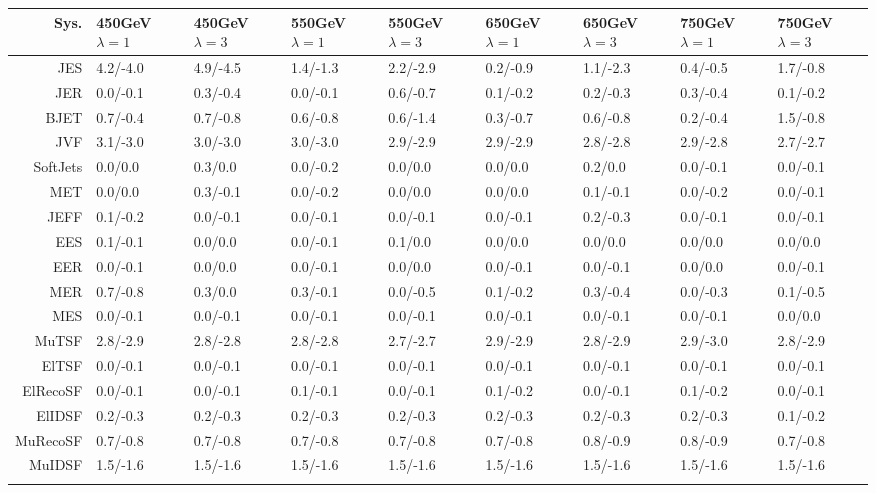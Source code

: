 \begin{tabular}{r|p{.08\linewidth}p{.08\linewidth}p{.08\linewidth}p{.08\linewidth}p{.08\linewidth}p{.08\linewidth}p{.08\linewidth}p{.08\linewidth}}
\toprule
 Sys.  & 450GeV $\lambda=1$  & 450GeV $\lambda=3$  & 550GeV $\lambda=1$  & 550GeV $\lambda=3$  & 650GeV $\lambda=1$  & 650GeV $\lambda=3$  & 750GeV $\lambda=1$  & 750GeV $\lambda=3$  \\
\toprule
JES  & 4.2/-4.0 & 4.9/-4.5 & 1.4/-1.3 & 2.2/-2.9 & 0.2/-0.9 & 1.1/-2.3 & 0.4/-0.5 & 1.7/-0.8 \\
JER  & 0.0/-0.1 & 0.3/-0.4 & 0.0/-0.1 & 0.6/-0.7 & 0.1/-0.2 & 0.2/-0.3 & 0.3/-0.4 & 0.1/-0.2 \\
BJET  & 0.7/-0.4 & 0.7/-0.8 & 0.6/-0.8 & 0.6/-1.4 & 0.3/-0.7 & 0.6/-0.8 & 0.2/-0.4 & 1.5/-0.8 \\
JVF  & 3.1/-3.0 & 3.0/-3.0 & 3.0/-3.0 & 2.9/-2.9 & 2.9/-2.9 & 2.8/-2.8 & 2.9/-2.8 & 2.7/-2.7 \\
SoftJets  & 0.0/0.0 & 0.3/0.0 & 0.0/-0.2 & 0.0/0.0 & 0.0/0.0 & 0.2/0.0 & 0.0/-0.1 & 0.0/-0.1 \\
MET  & 0.0/0.0 & 0.3/-0.1 & 0.0/-0.2 & 0.0/0.0 & 0.0/0.0 & 0.1/-0.1 & 0.0/-0.2 & 0.0/-0.1 \\
JEFF  & 0.1/-0.2 & 0.0/-0.1 & 0.0/-0.1 & 0.0/-0.1 & 0.0/-0.1 & 0.2/-0.3 & 0.0/-0.1 & 0.0/-0.1 \\
EES  & 0.1/-0.1 & 0.0/0.0 & 0.0/-0.1 & 0.1/0.0 & 0.0/0.0 & 0.0/0.0 & 0.0/0.0 & 0.0/0.0 \\
EER  & 0.0/-0.1 & 0.0/0.0 & 0.0/-0.1 & 0.0/0.0 & 0.0/-0.1 & 0.0/-0.1 & 0.0/0.0 & 0.0/-0.1 \\
MER  & 0.7/-0.8 & 0.3/0.0 & 0.3/-0.1 & 0.0/-0.5 & 0.1/-0.2 & 0.3/-0.4 & 0.0/-0.3 & 0.1/-0.5 \\
MES  & 0.0/-0.1 & 0.0/-0.1 & 0.0/-0.1 & 0.0/-0.1 & 0.0/-0.1 & 0.0/-0.1 & 0.0/-0.1 & 0.0/0.0 \\
MuTSF  & 2.8/-2.9 & 2.8/-2.8 & 2.8/-2.8 & 2.7/-2.7 & 2.9/-2.9 & 2.8/-2.9 & 2.9/-3.0 & 2.8/-2.9 \\
ElTSF  & 0.0/-0.1 & 0.0/-0.1 & 0.0/-0.1 & 0.0/-0.1 & 0.0/-0.1 & 0.0/-0.1 & 0.0/-0.1 & 0.0/-0.1 \\
ElRecoSF  & 0.0/-0.1 & 0.0/-0.1 & 0.1/-0.1 & 0.0/-0.1 & 0.1/-0.2 & 0.0/-0.1 & 0.1/-0.2 & 0.0/-0.1 \\
ElIDSF  & 0.2/-0.3 & 0.2/-0.3 & 0.2/-0.3 & 0.2/-0.3 & 0.2/-0.3 & 0.2/-0.3 & 0.2/-0.3 & 0.1/-0.2 \\
MuRecoSF  & 0.7/-0.8 & 0.7/-0.8 & 0.7/-0.8 & 0.7/-0.8 & 0.7/-0.8 & 0.8/-0.9 & 0.8/-0.9 & 0.7/-0.8 \\
MuIDSF  & 1.5/-1.6 & 1.5/-1.6 & 1.5/-1.6 & 1.5/-1.6 & 1.5/-1.6 & 1.5/-1.6 & 1.5/-1.6 & 1.5/-1.6 \\
 \\
\bottomrule
\end{tabular}
